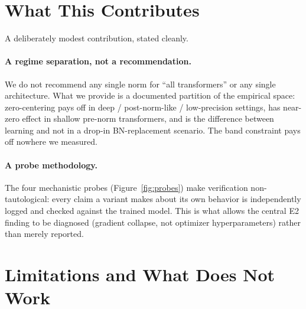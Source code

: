 \documentclass{article}
\begin{document}
\section{What This Contributes}
\label{sec:contributions}

A deliberately modest contribution, stated cleanly.

\paragraph{A regime separation, not a recommendation.}
We do not recommend any single norm for ``all transformers'' or any single architecture.
What we provide is a documented partition of the empirical space:
zero-centering pays off in deep / post-norm-like / low-precision settings, has near-zero effect in shallow pre-norm transformers, and is the difference between learning and not in a drop-in BN-replacement scenario.
The band constraint pays off nowhere we measured.

\paragraph{A probe methodology.}
The four mechanistic probes (Figure~\ref{fig:probes}) make verification non-tautological: every claim a variant makes about its own behavior is independently logged and checked against the trained model.
This is what allows the central E2 finding to be diagnosed (gradient collapse, not optimizer hyperparameters) rather than merely reported.

\section{Limitations and What Does Not Work}
\label{sec:limitations}
\end{document}
